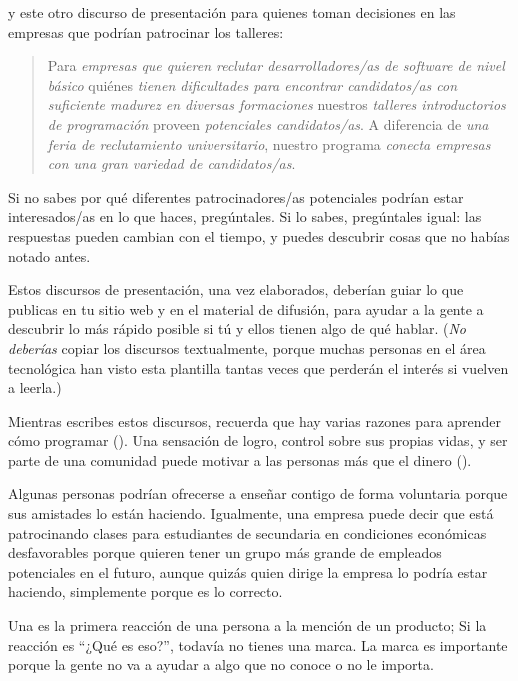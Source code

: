 \noindent
y este otro discurso de presentación para quienes toman decisiones en las empresas que podrían patrocinar los talleres:

\begin{quote}

  Para \emph{empresas que quieren reclutar desarrolladores/as de software de nivel básico}
  quiénes \emph{tienen dificultades para encontrar candidatos/as con suficiente madurez en diversas formaciones}
  nuestros \emph{talleres introductorios de programación}
  proveen \emph{potenciales candidatos/as}.
  A diferencia de \emph{una feria de reclutamiento universitario},
  nuestro programa \emph{conecta empresas con una gran variedad de candidatos/as}.
\end{quote}

Si no sabes por qué diferentes patrocinadores/as potenciales podrían estar interesados/as en lo que haces,
pregúntales.
Si lo sabes,
pregúntales igual:
las respuestas pueden cambian con el tiempo,
y puedes descubrir cosas que no habías notado antes.

Estos discursos de presentación, una vez elaborados,
deberían guiar lo que publicas en tu sitio web y en el material de difusión,
para ayudar a la gente a descubrir lo más rápido posible
si tú y ellos tienen algo de qué hablar.
(\emph{No deberías} copiar los discursos textualmente,
porque
muchas personas en el área tecnológica han visto esta plantilla tantas veces que 
perderán el interés si vuelven a leerla.) 

Mientras escribes estos discursos,
recuerda que hay varias razones para aprender cómo programar ().
Una sensación de logro,
control sobre sus propias vidas,
y ser parte de una comunidad puede motivar a las personas más que el dinero
().

Algunas personas podrían ofrecerse a enseñar contigo de forma voluntaria  
porque sus amistades lo están haciendo. Igualmente, una empresa puede decir que 
está patrocinando clases para estudiantes de secundaria en condiciones económicas desfavorables 
porque quieren tener un grupo más grande de empleados potenciales en el futuro, 
aunque quizás quien dirige la empresa lo podría estar haciendo, simplemente porque es lo correcto.


Una  es la primera reacción de una persona a la mención de un producto;
Si la reacción es ``¿Qué es eso?'',
todavía no tienes una marca.
La marca es importante porque
la gente no va a ayudar a algo que no conoce o no le importa.

